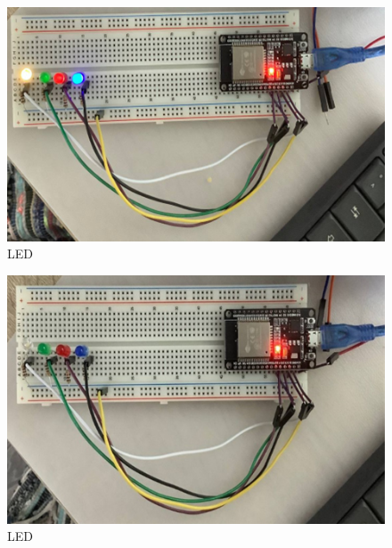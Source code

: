 \begin{figure}[htbp]
\centerline{\includegraphics{image8.png}}
\caption{LED}
\label{fig}
\end{figure}


\begin{figure}[htbp]
\centerline{\includegraphics{image9.png}}
\caption{LED}
\label{fig}
\end{figure}



